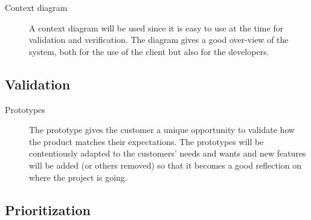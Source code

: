 \documentclass[10pt,a4paper]{article}
\begin{document}
\begin{description}
\item[Context diagram] A context diagram will be used since it is easy to use at the time for validation and verification. The diagram gives a good over-view of the system, both for the use of the client but also for the developers. 
\end{description}

\subsection{Validation}
\begin{description}
\item[Prototypes] The prototype gives the customer a unique opportunity to validate how the product matches their expectations. The prototypes will be contentiously adapted to the customers' needs and wants and new features will be added (or others removed) so that it becomes a good reflection on where the project is going. %
\end{description}


\subsection{Prioritization}



\end{document}

